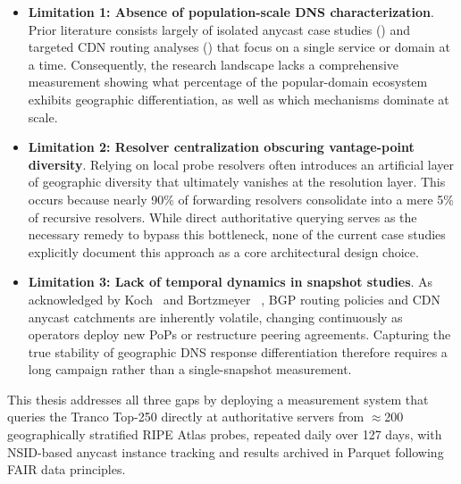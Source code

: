 \begin{itemize}
\item \textbf{Limitation 1: Absence of population-scale \ac{DNS} characterization}. Prior literature consists largely of isolated anycast case studies (\cite{Bortzmeyer2013,Finnegan2018}) and targeted \ac{CDN} routing analyses (\cite{Hours2016,Li2025}) that focus on a single service or domain at a time. Consequently, the research landscape lacks a comprehensive measurement showing what percentage of the popular-domain ecosystem exhibits geographic differentiation, as well as which mechanisms dominate at scale.

\item \textbf{Limitation 2: Resolver centralization obscuring vantage-point diversity}. Relying on local probe resolvers often introduces an artificial layer of geographic diversity that ultimately vanishes at the resolution layer. This occurs because nearly 90\% of forwarding resolvers consolidate into a mere 5\% of recursive resolvers\cite{Xu2023}. While direct authoritative querying serves as the necessary remedy to bypass this bottleneck, none of the current case studies explicitly document this approach as a core architectural design choice.

\item \textbf{Limitation 3: Lack of temporal dynamics in snapshot studies}. As acknowledged by Koch~\cite{Koch2021} and Bortzmeyer ~\cite{Bortzmeyer2013}, \ac{BGP} routing policies and \ac{CDN} anycast catchments are inherently volatile, changing continuously as operators deploy new \ac{PoPs} or restructure peering agreements. Capturing the true stability of geographic \ac{DNS} response differentiation therefore requires a long campaign rather than a single-snapshot measurement.
\end{itemize}

This thesis addresses all three gaps by deploying a measurement system that queries the Tranco Top-250 directly at authoritative servers from $\approx$200 geographically stratified RIPE Atlas probes, repeated daily over 127 days, with \ac{NSID}-based anycast instance tracking and results archived in Parquet following \ac{FAIR} data principles.